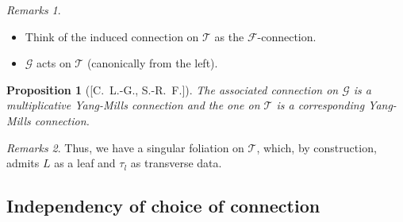 \documentclass[hyperref={pdfpagelabels=false}]{beamer}
\theoremstyle{plain}
\newtheorem{proposition}[theorem]{Proposition}
\theoremstyle{remark}
\newtheorem*{remark}{Remarks}
\begin{document}
{\begin{frame}
\begin{remark}
\begin{itemize}
	\item Think of the induced connection on $\mathcal{T}$ as the $\mathcal{F}$-connection.
	\item $\mathcal{G}$ acts on $\mathcal{T}$ (canonically from the left).
\end{itemize}
\end{remark}

\end{frame}

\begin{frame}
\begin{proposition}[{[C.\ L.-G., S.-R.\ F.]}]
The associated connection on $\mathcal{G}$ is a multiplicative Yang-Mills connection and the one on $\mathcal{T}$ is a corresponding Yang-Mills connection.
\end{proposition}

\begin{remark}
Thus, we have a singular foliation on $\mathcal{T}$, which, by construction, admits $L$ as a leaf and $\tau_l$ as transverse data.
\end{remark}
\end{frame}

{

\subsection{Independency of choice of connection}


}}
\end{document}
